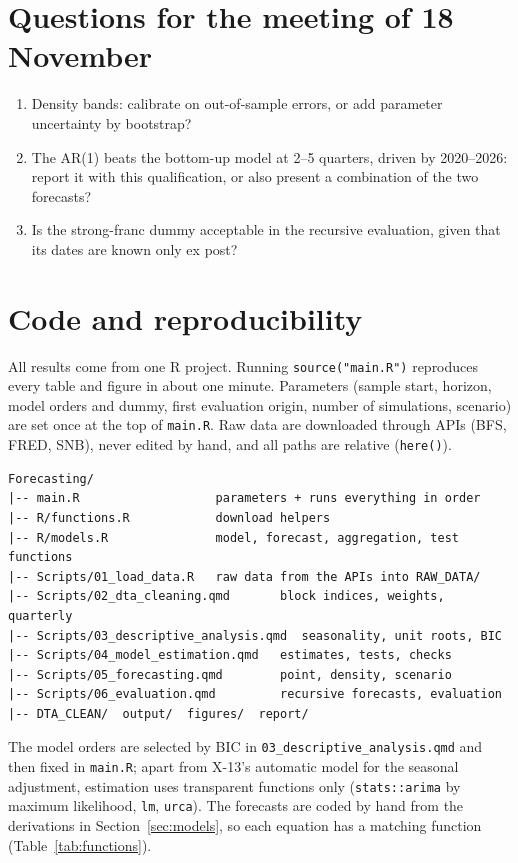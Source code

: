 \documentclass[11pt,a4paper]{article}
\begin{document}
\section*{Questions for the meeting of 18 November}
\begin{enumerate}
  \item Density bands: calibrate on out-of-sample errors, or add parameter uncertainty by bootstrap?
  \item The AR(1) beats the bottom-up model at 2--5 quarters, driven by 2020--2026: report it with
        this qualification, or also present a combination of the two forecasts?
  \item Is the strong-franc dummy acceptable in the recursive evaluation, given that its dates are
        known only ex post?
\end{enumerate}

\appendix
\section{Code and reproducibility}\label{app:code}
All results come from one R project. Running \texttt{source("main.R")} reproduces every table and
figure in about one minute. Parameters (sample start, horizon, model orders and dummy, first
evaluation origin, number of simulations, scenario) are set once at the top of \texttt{main.R}. Raw
data are downloaded through APIs (BFS, FRED, SNB), never edited by hand, and all paths are relative
(\texttt{here()}).

{\small
\begin{verbatim}
Forecasting/
|-- main.R                   parameters + runs everything in order
|-- R/functions.R            download helpers
|-- R/models.R               model, forecast, aggregation, test functions
|-- Scripts/01_load_data.R   raw data from the APIs into RAW_DATA/
|-- Scripts/02_dta_cleaning.qmd       block indices, weights, quarterly
|-- Scripts/03_descriptive_analysis.qmd  seasonality, unit roots, BIC
|-- Scripts/04_model_estimation.qmd   estimates, tests, checks
|-- Scripts/05_forecasting.qmd        point, density, scenario
|-- Scripts/06_evaluation.qmd         recursive forecasts, evaluation
|-- DTA_CLEAN/  output/  figures/  report/
\end{verbatim}}

The model orders are selected by BIC in \texttt{03\_descriptive\_analysis.qmd} and then fixed in
\texttt{main.R}; apart from X-13's automatic model for the seasonal adjustment, estimation uses
transparent functions only (\texttt{stats::arima} by maximum likelihood, \texttt{lm}, \texttt{urca}).
The forecasts are coded by hand from the derivations in Section~\ref{sec:models}, so each equation has
a matching function (Table~\ref{tab:functions}).
\end{document}
